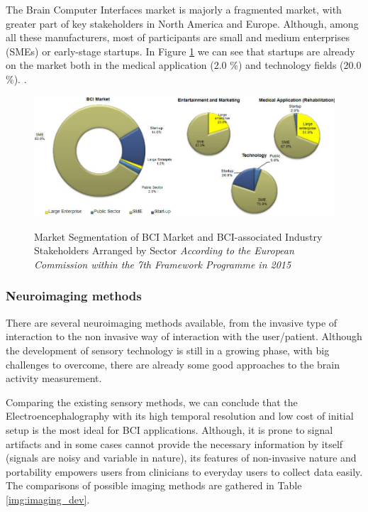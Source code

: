 \documentclass[letterpaper,10pt]{article}
\begin{document}
The  Brain Computer  Interfaces  market  is  majorly  a  fragmented  market,  with  greater part  of  key  stakeholders in  North America and Europe. Although, among all these manufacturers, most of participants are small and medium enterprises (SMEs) or early-stage startups. \cite{bci_fs} In Figure \ref{fig:bci_market} we can see that startups are already on the market both in the medical application (2.0 \%) and technology fields (20.0 \%).  
.
\begin{figure}[h]
\centering
\includegraphics[scale=0.6]{marketBCI.png}
\caption[Market Segmentation of BCI Market and BCI-associated Industry Stakeholders Arranged by Sector]{Market Segmentation of BCI Market and BCI-associated Industry Stakeholders Arranged by Sector \textit{According to the European Commission within the 7th Framework Programme in 2015}} \cite{bci_fs}
\label{fig:bci_market} 
\end{figure}

\subsubsection{Neuroimaging methods}

There are several neuroimaging methods available, from the invasive type of interaction to the non invasive way of interaction with the user/patient. Although the development of sensory technology is still in a growing phase, with big challenges to overcome, there are already some good approaches to the brain activity measurement.

Comparing the existing sensory methods, we can conclude that the Electroencephalography with its high temporal resolution and low cost of initial setup is the most ideal for BCI applications. Although, it is prone to signal artifacts and in some cases cannot provide the necessary information by itself (signals are noisy and variable in nature), its features of non-invasive nature and portability empowers users from clinicians to everyday users to collect data easily. \cite{bci_fs} The comparisons of possible imaging methods are gathered in Table \ref{img:imaging_dev}. 
\end{document}
